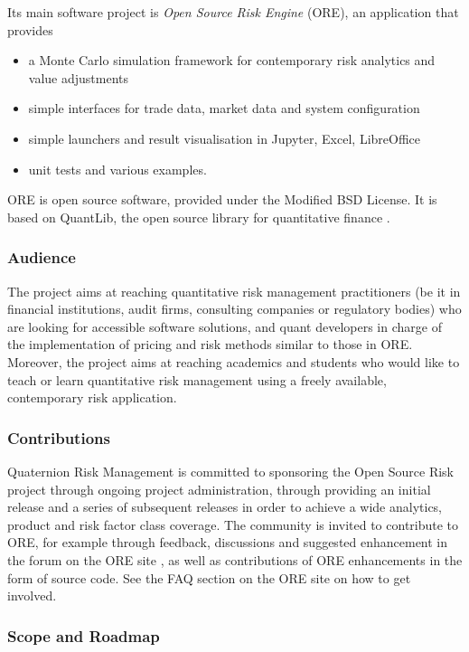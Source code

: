 \documentclass[12pt, a4paper]{article}
\begin{document}
Its main software project is {\em Open Source Risk Engine} (ORE), an application that provides
\begin{itemize}
\item a Monte Carlo simulation framework for contemporary risk analytics and value adjustments
\item simple interfaces for trade data, market data and system configuration
\item simple launchers and result visualisation in Jupyter, Excel, LibreOffice
\item unit tests and various examples.  
\end{itemize}
ORE is open source software, provided under the Modified BSD License. It is based 
on QuantLib, the open source library for quantitative finance \cite{QL}.

\subsubsection*{Audience}
The project aims at reaching quantitative risk ma\-nage\-ment practitioners (be it in financial institutions, audit
firms, consulting companies or regulatory bodies) who are looking for accessible software solutions, and quant
developers in charge of the implementation of pricing and risk methods similar to those in ORE. Moreover, the project
aims at reaching academics and students who would like to teach or learn quantitative risk management using a freely
available, contemporary risk application.

\subsubsection*{Contributions}
Quaternion Risk Management \cite{QRM} is committed to sponsoring the Open Source Risk project through ongoing project
administration, through providing an initial release and a series of subsequent releases in order to achieve a wide
analytics, product and risk factor class coverage. The community is invited to contribute to ORE, for example through
feedback, discussions and suggested enhancement in the forum on the ORE site \cite{ORE}, as well as contributions of ORE
enhancements in the form of source code. See the FAQ section on the ORE site \cite{ORE} on how to get involved.

\subsubsection*{Scope and Roadmap}
\end{document}
